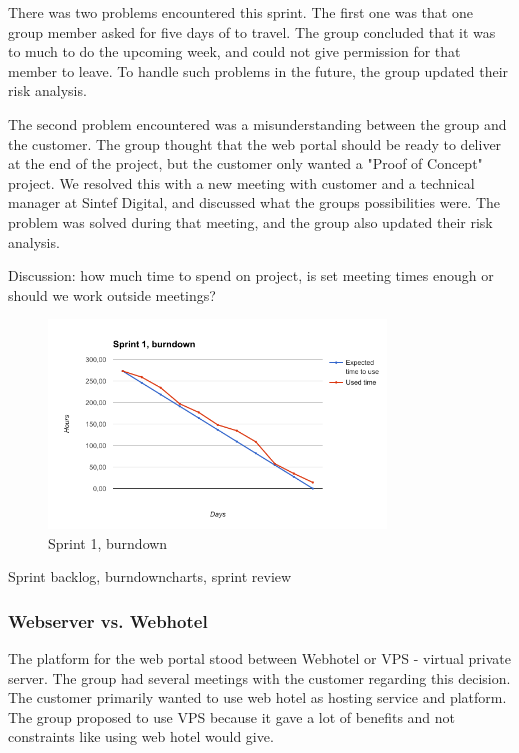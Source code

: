 There was two problems encountered this sprint. The first one was that one group member asked for five days of to travel. The group concluded that it was to much to do the upcoming week, and could not give permission for that member to leave. To handle such problems in the future, the group updated their risk analysis. 

The second problem encountered was a misunderstanding between the group and the customer. The group thought that the web portal should be ready to deliver at the end of the project, but the customer only wanted a "Proof of Concept" project. We resolved this with a new meeting with customer and a technical manager at Sintef Digital, and discussed what the groups possibilities were. The problem was solved during that meeting, and the group also updated their risk analysis.

Discussion: how much time to spend on project, is set meeting times enough or should we work outside meetings?

\begin{figure}[h!]
\centering
    \includegraphics[width=0.8\textwidth]{fig/sprint1}
\caption{Sprint 1, burndown}
\end{figure}

Sprint backlog, burndowncharts, sprint review

\subsubsection{Webserver vs. Webhotel}
The platform for the web portal stood between Webhotel or VPS - virtual private server.  The group had several meetings with the customer regarding this decision. The customer primarily wanted to use web hotel as hosting service and platform. The group proposed to use VPS because it gave a lot of benefits and not constraints like using web hotel would give. 


